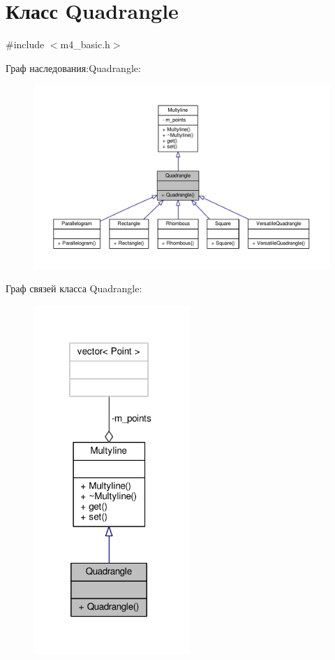 \hypertarget{class_quadrangle}{\section{Класс Quadrangle}
\label{class_quadrangle}
}


{\ttfamily \#include $<$m4\-\_\-basic.\-h$>$}



Граф наследования\-:Quadrangle\-:
\nopagebreak
\begin{figure}[H]
\begin{center}
\leavevmode
\includegraphics[width=350pt]{class_quadrangle__inherit__graph}
\end{center}
\end{figure}


Граф связей класса Quadrangle\-:
\nopagebreak
\begin{figure}[H]
\begin{center}
\leavevmode
\includegraphics[width=167pt]{class_quadrangle__coll__graph}
\end{center}
\end{figure}
